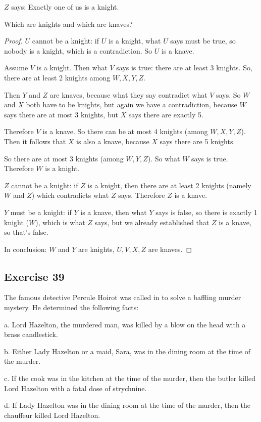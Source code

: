 \documentclass[14pt]{extarticle}
\begin{document}
$Z$ says: Exactly one of us is a knight.

Which are knights and which are knaves?

\begin{proof} $U$ cannot be a knight: if $U$ is a knight, what $U$ says must be
true, so nobody is a knight, which is a contradiction. So $U$ is a knave.

Assume $V$ is a knight. Then what $V$ says is true: there are at least 3
knights. So, there are at least 2 knights among $W, X, Y, Z$.

Then $Y$ and $Z$ are knaves, because what they say contradict what $V$ says. So
$W$ and $X$ both have to be knights, but again we have a contradiction, because
$W$ says there are at most 3 knights, but $X$ says there are exactly 5.

Therefore $V$ is a knave. So there can be at most 4 knights (among $W, X, Y,
Z$). Then it follows that $X$ is also a knave, because $X$ says there are 5
knights.

So there are at most 3 knights (among $W, Y, Z$). So what $W$ says is true.
Therefore $W$ is a knight.

$Z$ cannot be a knight: if $Z$ is a knight, then there are at least 2 knights
(namely $W$ and $Z$) which contradicts what $Z$ says. Therefore $Z$ is a knave.

$Y$ must be a knight: if $Y$ is a knave, then what $Y$ says is false, so there
is exactly 1 knight ($W$), which is what $Z$ says, but we already established
that $Z$ is a knave, so that's false.

In conclusion: $W$ and $Y$ are knights, $U,V,X,Z$ are knaves. \end{proof}
\subsection{Exercise 39} The famous detective Percule Hoirot was called in to
solve a baffling murder mystery. He determined the following facts:

a. Lord Hazelton, the murdered man, was killed by a blow on the head with a
brass candlestick.

b. Either Lady Hazelton or a maid, Sara, was in the dining room at the time of
the murder.

c. If the cook was in the kitchen at the time of the murder, then the butler
killed Lord Hazelton with a fatal dose of strychnine.

d. If Lady Hazelton was in the dining room at the time of the murder, then the
chauffeur killed Lord Hazelton.
\end{document}
